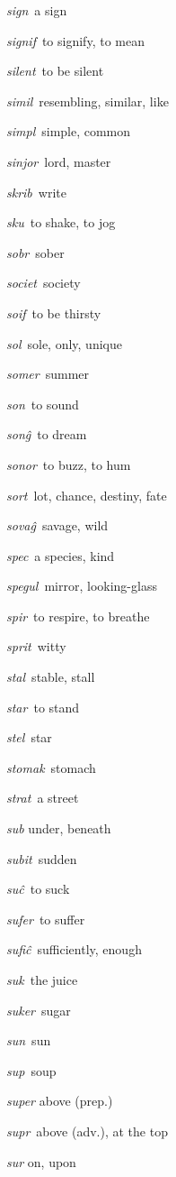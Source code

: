 \begin{landscape}
\begin{multicols}{5}
\begin{outdent}{1em}
\emph{sign\,} a sign

\emph{signif\,} to signify, to mean

\emph{silent\,} to be silent

\emph{simil\,} resembling, similar, like

\emph{simpl\,} simple, common

\emph{sinjor\,} lord, master

\emph{skrib\,} write

\emph{sku\,} to shake, to jog

\emph{sobr\,} sober

\emph{societ\,} society

\emph{soif\,} to be thirsty

\emph{sol\,} sole, only, unique

\emph{somer\,} summer

\emph{son\,} to sound

\emph{sonĝ\,} to dream

\emph{sonor\,} to buzz, to hum

\emph{sort\,} lot, chance, destiny, fate

\emph{sovaĝ\,} savage, wild

\emph{spec\,} a species, kind

\emph{spegul\,} mirror, looking-glass

\emph{spir\,} to respire, to breathe

\emph{sprit\,} witty

\emph{stal\,} stable, stall

\emph{star\,} to stand

\emph{stel\,} star

\emph{stomak\,} stomach

\emph{strat\,} a street

\emph{sub} under, beneath

\emph{subit\,} sudden

\emph{suĉ\,} to suck

\emph{sufer\,} to suffer

\emph{sufiĉ\,} sufficiently, enough

\emph{suk\,} the juice

\emph{suker\,} sugar

\emph{sun\,} sun

\emph{sup\,} soup

\emph{super} above (prep.)

\emph{supr\,} above (adv.), at the top

\emph{sur} on, upon


\end{outdent}
\end{multicols}
\end{landscape}
